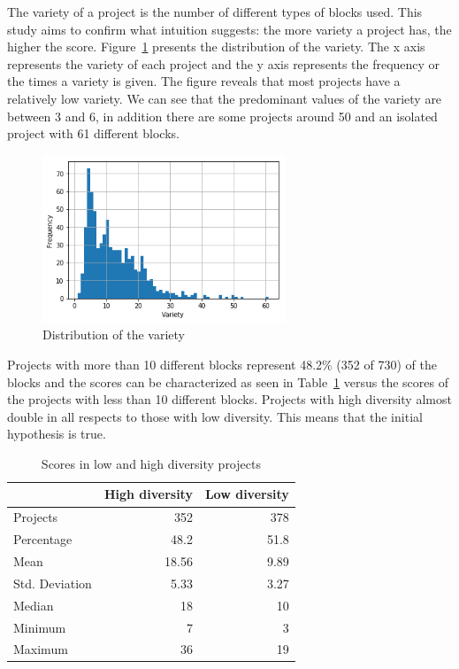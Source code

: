 \documentclass[a4paper]{article}
\begin{document}
The variety of a project is the number of different types of blocks used. This study aims to confirm what intuition suggests: the more variety a project has, the higher the score. 
Figure~\ref{fig:var-dist} presents the distribution of the variety. The x axis represents the variety of each project and the y axis represents the frequency or the times a variety is given. The figure reveals that most projects have a relatively low variety. We can see that the predominant values of the variety are between 3 and 6, in addition there are some projects around 50 and an isolated project with 61 different blocks. 

\begin{figure}
\begin{center}
\includegraphics[height=5cm]{fig1}
\caption{Distribution of the variety}
\label{fig:var-dist}
\end{center}
\end{figure}

Projects with more than 10 different blocks represent 48.2\% (352 of 730) of the blocks and the scores can be characterized as seen in Table~\ref{tab:comparison} versus the scores of the projects with less than 10 different blocks. Projects with high diversity almost double in all respects to those with low diversity. This means that the initial hypothesis is true.

\begin{table}
\begin{center}
\caption{Scores in low and high diversity projects}
\bigskip
\label{tab:comparison}
\begin{tabular}{|l|r|r|}
\hline
& High diversity & Low diversity \\ \hline
Projects & 352 & 378\\ \hline
Percentage & 48.2 & 51.8\\ \hline
Mean & 18.56 & 9.89\\ \hline
Std. Deviation & 5.33 & 3.27\\ \hline
Median & 18 & 10\\ \hline
Minimum & 7 & 3\\ \hline
Maximum & 36 & 19\\ \hline
\end{tabular}
\end{center}
\end{table}
\end{document}
